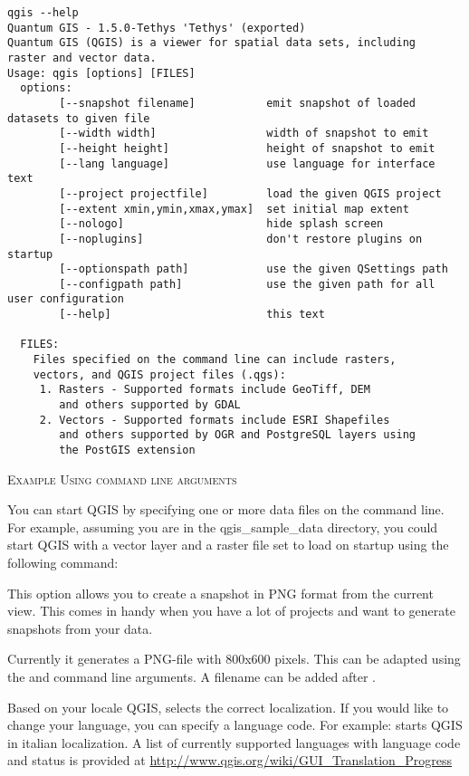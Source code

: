\small
\begin{verbatim}
qgis --help
Quantum GIS - 1.5.0-Tethys 'Tethys' (exported)
Quantum GIS (QGIS) is a viewer for spatial data sets, including
raster and vector data.
Usage: qgis [options] [FILES]
  options:
        [--snapshot filename]           emit snapshot of loaded datasets to given file
        [--width width]                 width of snapshot to emit
        [--height height]               height of snapshot to emit
        [--lang language]               use language for interface text
        [--project projectfile]         load the given QGIS project
        [--extent xmin,ymin,xmax,ymax]  set initial map extent
        [--nologo]                      hide splash screen
        [--noplugins]                   don't restore plugins on startup
        [--optionspath path]            use the given QSettings path
        [--configpath path]             use the given path for all user configuration
        [--help]                        this text

  FILES:
    Files specified on the command line can include rasters,
    vectors, and QGIS project files (.qgs):
     1. Rasters - Supported formats include GeoTiff, DEM
        and others supported by GDAL
     2. Vectors - Supported formats include ESRI Shapefiles
        and others supported by OGR and PostgreSQL layers using
        the PostGIS extension
\end{verbatim}
\normalsize

\begin{Tip} \caption{\textsc{Example Using command line arguments}}
You can start QGIS by specifying one or more data files
on the command line. For example, assuming you are in the
qgis\_sample\_data directory, you could start QGIS with a vector layer
and a raster file set to load on startup using the following command:
\end{Tip}

This option allows you to create a snapshot in PNG format from the current view.
This comes in handy when you have a lot of projects and want to
generate snapshots from your data.

Currently it generates a PNG-file with 800x600 pixels. This can be adapted
using the  and  command line
arguments. A filename can be added after .

Based on your locale QGIS, selects the correct localization. If you would like
to change your language, you can specify a language code. For example:
starts QGIS in italian localization. A list of currently supported
languages with language code and status is provided at
\url{http://www.qgis.org/wiki/GUI_Translation_Progress}

